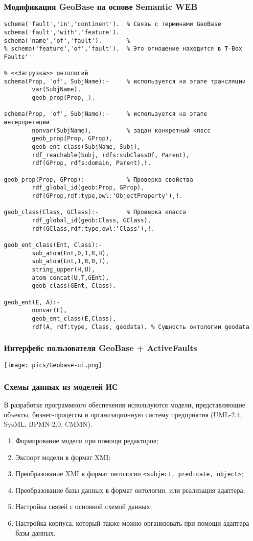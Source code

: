\documentclass[10pt]{beamer}
\begin{document}
\begin{frame}[fragile]
  \frametitle{Модификация GeoBase на основе Semantic WEB}
\begin{verbatim}
schema('fault','in','continent').  % Связь с терминами GeoBase
schema('fault','with','feature').
schema('name','of','fault').       %
% schema('feature','of','fault').  % Это отношение находится в T-Box Faults''

% <<Загрузка>> онтологий
schema(Prop, 'of', SubjName):-     % используется на этапе трансляции
        var(SubjName),
        geob_prop(Prop,_).

schema(Prop, 'of', SubjName):-     % используется на этапе интерпретации
        nonvar(SubjName),          % задан конкретный класс
        geob_prop(Prop, GProp),
        geob_ent_class(SubjName, Subj),
        rdf_reachable(Subj, rdfs:subClassOf, Parent),
        rdf(GProp, rdfs:domain, Parent),!.

geob_prop(Prop, GProp):-           % Проверка свойства
        rdf_global_id(geob:Prop, GProp),
        rdf(GProp,rdf:type,owl:'ObjectProperty'),!.

geob_class(Class, GClass):-        % Проверка класса
        rdf_global_id(geob:Class, GClass),
        rdf(GClass,rdf:type,owl:'Class'),!.

geob_ent_class(Ent, Class):-
        sub_atom(Ent,0,1,R,H),
        sub_atom(Ent,1,R,0,T),
        string_upper(H,U),
        atom_concat(U,T,GEnt),
        geob_class(GEnt, Class).

geob_ent(E, A):-
        nonvar(E),
        geob_ent_class(E,Class),
        rdf(A, rdf:type, Class, geodata). % Сущность онтологии geodata
\end{verbatim}
\end{frame}

\begin{frame}[fragile]
  \frametitle{Интерфейс пользователя GeoBase + ActiveFaults}
  \begin{center}
    \texttt{[image: pics/Geobase-ui.png]}
  \end{center}
\end{frame}

\begin{frame}[fragile]
  \frametitle{Схемы данных из моделей ИС}
  В разработке программного обеспечения используются модели, представляющие объекты, бизнес-процессы и организационную систему предприятия (UML-2.4, SysML, BPMN-2.0, CMMN).
  \begin{enumerate}
  \item Формирование модели при помощи редакторов;
  \item Экспорт модели в формат XMI;
  \item Преобразование XMI в формат онтологии \verb|<subject, predicate, object>|;
  \item Преобразование базы данных в формат онтологии, или реализация адаптера;
  \item Настройка связей с основной схемой данных;
  \item Настройка корпуса, который также можно организовать при помощи адаптера базы данных.
  \end{enumerate}
\end{frame}
\end{document}
